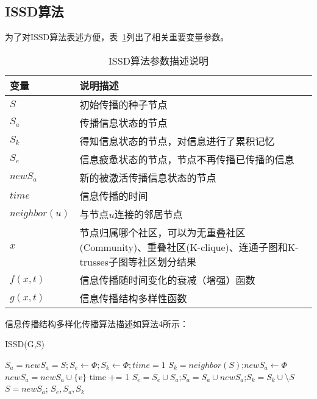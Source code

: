 \subsection{ISSD算法}
为了对ISSD算法表述方便，表~\ref{tab:ISSD_table}列出了相关重要变量参数。
\begin{table}[htbp]
	\centering
	\begin{minipage}[t]{0.9\linewidth}
		\caption{ISSD算法参数描述说明}
		\label{tab:ISSD_table}
		\begin{tabular}{p{2.1cm}p{9cm}}
			\toprule[1.5pt]
			\heiti 变量 &  \heiti 说明描述 \\  
			\midrule[1pt]
			$S$& 初始传播的种子节点 \\
			$S_a$& 传播信息状态的节点 \\
			$S_k$& 得知信息状态的节点，对信息进行了累积记忆 \\
			$S_e$& 信息疲惫状态的节点，节点不再传播已传播的信息 \\
			$newS_a$& 新的被激活传播信息状态的节点 \\
			$time$& 信息传播的时间 \\
			$neighbor(u)$& 与节点$u$连接的邻居节点 \\
			$x$& 节点归属哪个社区，可以为无重叠社区(Community)、重叠社区(K-clique)、连通子图和K-trusses子图等社区划分结果 \\
			$f(x,t)$& 信息传播随时间变化的衰减（增强）函数 \\
			$g(x,t)$& 信息传播结构多样性函数 \\
			\bottomrule[1.5pt]
		\end{tabular}
	\end{minipage}
\end{table}

信息传播结构多样化传播算法描述如算法4所示：
\begin{algorithm}
	\caption{ISSD(G,S)}%
	\label{alg:chap5:ISSDalgorithm}
	\begin{algorithmic}[1]
		\STATE $S_a=newS_a=S; S_e \leftarrow \Phi; S_k \leftarrow \Phi; time = 1$
		\STATE $S_k = neighbor(S)$;$newS_a \leftarrow \Phi$
		\STATE $newS_a = newS_a \cup \{v\}$
		\ENDIF
		\ENDFOR
		\ENDFOR
		\STATE time +=  1
		\STATE $S_e = S_e \cup S_a $;$S_a = S_a \cup newS_a$;$S_k=S_k \cup \setminus S$
		\STATE $S=newS_a$;
		\ENDWHILE
		\RETURN $S_e,S_a,S_k$
	\end{algorithmic}
\end{algorithm}

